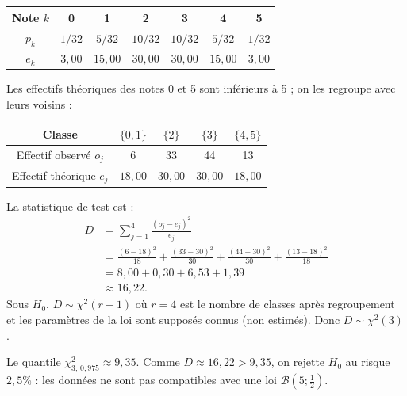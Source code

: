 {\begin{enumerate}
{			\begin{center}
				\begin{tabular}{|c|c|c|c|c|c|c|}
					\hline
					Note $k$ & 0 & 1 & 2 & 3 & 4 & 5 \\
					\hline
					$p_k$ & $1/32$ & $5/32$ & $10/32$ & $10/32$ & $5/32$ & $1/32$ \\
					\hline
					$e_k$ & $3{,}00$ & $15{,}00$ & $30{,}00$ & $30{,}00$ & $15{,}00$ & $3{,}00$ \\
					\hline
				\end{tabular}
			\end{center}
			
			Les effectifs théoriques des notes 0 et 5 sont inférieurs à 5 ; on les regroupe avec leurs voisins :
			
			\begin{center}
				\begin{tabular}{|c|c|c|c|c|}
					\hline
					Classe & $\{0,1\}$ & $\{2\}$ & $\{3\}$ & $\{4,5\}$ \\
					\hline
					Effectif observé $o_j$ & 6 & 33 & 44 & 13 \\
					\hline
					Effectif théorique $e_j$ & $18{,}00$ & $30{,}00$ & $30{,}00$ & $18{,}00$ \\
					\hline
				\end{tabular}
			\end{center}
			
			La statistique de test est :
			\begin{align*}
D &= \sum_{j=1}^{4} \frac{(o_j - e_j)^2}{e_j} \\
&= \frac{(6-18)^2}{18} + \frac{(33-30)^2}{30} + \frac{(44-30)^2}{30} + \frac{(13-18)^2}{18} \\
&= 8{,}00 + 0{,}30 + 6{,}53 + 1{,}39 \\
&\approx 16{,}22.
\end{align*}
			Sous $H_0$, $D \sim \chi^2(r - 1)$ où $r = 4$ est le nombre de classes après regroupement et les paramètres de la loi sont supposés connus (non estimés). Donc $D \sim \chi^2(3)$.
			
			Le quantile $\chi^2_{3;\,0{,}975} \approx 9{,}35$. Comme $D \approx 16{,}22 > 9{,}35$, on rejette $H_0$ au risque $2{,}5\%$ : les données ne sont pas compatibles avec une loi $\mathcal{B}(5;\frac{1}{2})$.
		}
		
	\end{enumerate}
}